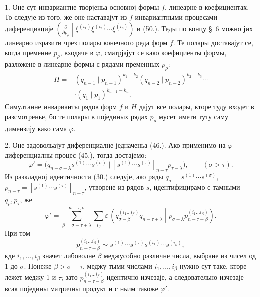 \documentclass[11pt]{article}
\newcommand{\pair}[2]{\left(#1\middle|#2\right)}
\newcommand{\eps}{\varepsilon}
\begin{document}
1. Оне сут инвариантне творјеньа основној формы $f$, линеарне в коефициентах. То следује из того, же оне наставајут из $f$ инвариантными процесами диференциације
$\left(\frac{\partial}{\partial p_\rho}\middle|\xi^{(i_1)}\xi^{(i_2)}\cdots\xi^{(i_\rho)}\right)$ и (50.). Теды по концу \S\ 6 можно јих линеарно изразити чрез полары конечного реда форм $f$. Те полары доставајут се, когда пременне $p_\rho$, входяче в $\varphi$, сматрјајут се како коефициенты формы, разложене в линеарне формы с рядами пременных $p_\rho$:
\begin{equation}
\begin{aligned}
 H={}&(q_{n-1}\mid p_{n-1})^{k_1-k_2}
(q_{n-2}\mid p_{n-2})^{k_2-k_3}\cdots\\
&\cdot(q_1\mid p_1)^{k_{n-1}-k_n}.
\end{aligned}
\tag{52}
\end{equation}
Симултанне инварианты рядов форм $f$ и $H$ дајут все полары, кторе туду входет в разсмотренье, бо те полары в појединых рядах $p_\rho$ мусет имети туту саму димензију како сама $\varphi$.

2. Оне задовольајут диференциалне једначеньа (46.). Ако применимо на $\varphi$ диференциалны процес (45.), тогда достајемо:
\[
 \varphi'=\bigl(q_{n-\sigma-\lambda}s^{(1)}\cdots s^{(\sigma)}\mid [s^{(1)}\cdots s^{(\tau)}]_{n-\tau}p_{\tau-\lambda}\bigr),\qquad (\sigma>\tau).
\]
Из разкладној идентичности (30.) следује, ако ряды $q_\sigma=s^{(1)}\cdots s^{(\sigma)}$, $p_{n-\tau}=[s^{(1)}\cdots s^{(\tau)}]_{n-\tau}$, утворене из рядов $s$, идентифицирамо с тамными $q_\rho,p_\tau$, же
\[
 \varphi'=\sum_{\beta=\sigma-\tau+\lambda}^{n-\tau,\sigma}\sum_{i_\beta}\eps\,
 \pair{q_{\sigma-\beta}^{(i_1\ldots i_\beta)}q_{n-\tau+\lambda}}{p_{\sigma+\lambda}p_{n-\tau-\beta}^{(i_1\ldots i_\beta)}}.
\]
При том
\[
 p_{n-\tau-\beta}^{(i_1\ldots i_\beta)}\sim s^{(1)}\cdots s^{(\tau)}s^{(i_1)}\cdots s^{(i_\beta)},
\]
кде $i_1,\ldots,i_\beta$ значет либоволне $\beta$ меджусобно различне числа, выбране из чисел од 1 до $\sigma$. Понеже $\beta>\sigma-\tau$, меджу тыми числами $i_1,\ldots,i_\beta$ нужно сут таке, кторе лежет меджу 1 и $\tau$; зато $p_{n-\tau-\beta}^{(i_1\ldots i_\beta)}$ идентично изчезаје, а следовательно изчезаје всак поједины матричны продукт и с ньим такоже $\varphi'$.
\end{document}
